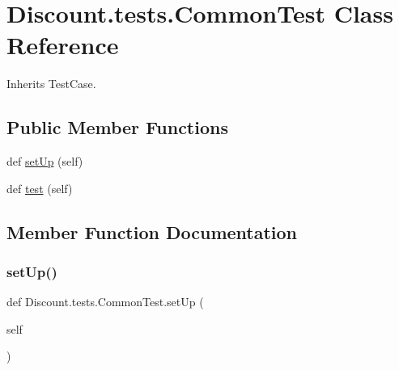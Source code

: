 \hypertarget{class_discount_1_1tests_1_1_common_test}{}\section{Discount.\+tests.\+Common\+Test Class Reference}
\label{class_discount_1_1tests_1_1_common_test}


Inherits Test\+Case.

\subsection*{Public Member Functions}
\begin{DoxyCompactItemize}
\item 
def \hyperlink{class_discount_1_1tests_1_1_common_test_aa6b3d09c79844bedd10299c9cbcf9521}{set\+Up} (self)
\item 
def \hyperlink{class_discount_1_1tests_1_1_common_test_a8a990896255795378e062b4bdd810d18}{test} (self)
\end{DoxyCompactItemize}


\subsection{Member Function Documentation}
\mbox{\label{class_discount_1_1tests_1_1_common_test_aa6b3d09c79844bedd10299c9cbcf9521}} 
\subsubsection{\texorpdfstring{set\+Up()}{setUp()}}
{\footnotesize\ttfamily def Discount.\+tests.\+Common\+Test.\+set\+Up (\begin{DoxyParamCaption}\item[{}]{self }\end{DoxyParamCaption})}

\mbox{\label{class_discount_1_1tests_1_1_common_test_a8a990896255795378e062b4bdd810d18}} 
